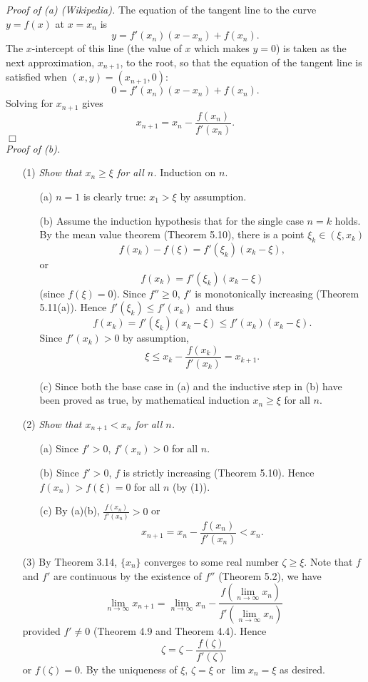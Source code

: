 \documentclass{article}
\begin{document}
\emph{Proof of (a) (Wikipedia).}
The equation of the tangent line to the curve $y = f(x)$ at $x = x_n$ is
\[
  y = f'(x_n)(x - x_n) + f(x_n).
\]
The $x$-intercept of this line (the value of $x$ which makes $y = 0$)
is taken as the next approximation, $x_{n+1}$, to the root,
so that the equation of the tangent line is satisfied when
$(x,y) = (x_{n+1},0)$:
\[
  0 = f'(x_n)(x - x_n) + f(x_n).
\]
Solving for $x_{n+1}$ gives
\[
  x_{n+1} = x_n - \frac{f(x_n)}{f'(x_n)}.
\]
$\Box$ \\



\emph{Proof of (b).}
\begin{enumerate}
\item[(1)]
\emph{Show that $x_n \geq \xi$ for all $n$.}
Induction on $n$.
  \begin{enumerate}
  \item[(a)]
  $n = 1$ is clearly true: $x_1 > \xi$ by assumption.

  \item[(b)]
  Assume the induction hypothesis that for the single case $n = k$ holds.
  By the mean value theorem (Theorem 5.10),
  there is a point $\xi_k \in (\xi, x_k)$
  \[
    f(x_k) - f(\xi) = f'(\xi_k)(x_k - \xi),
  \]
  or
  \[
    f(x_k) = f'(\xi_k)(x_k - \xi)
  \]
  (since $f(\xi) = 0$).
  Since $f'' \geq 0$, $f'$ is monotonically increasing (Theorem 5.11(a)).
  Hence $f'(\xi_k) \leq f'(x_k)$ and thus
  \[
    f(x_k)
    = f'(\xi_k)(x_k - \xi)
    \leq f'(x_k)(x_k - \xi).
  \]
  Since $f'(x_k) > 0$ by assumption,
  \[
    \xi \leq x_k - \frac{f(x_k)}{f'(x_k)} = x_{k+1}.
  \]

  \item[(c)]
  Since both the base case in (a) and
  the inductive step in (b) have been proved as true,
  by mathematical induction $x_n \geq \xi$ for all $n$.
  \end{enumerate}

\item[(2)]
\emph{Show that $x_{n+1} < x_n$ for all $n$.}
  \begin{enumerate}
  \item[(a)]
  Since $f' > 0$, $f'(x_n) > 0$ for all $n$.

  \item[(b)]
  Since $f' > 0$, $f$ is strictly increasing (Theorem 5.10).
  Hence $f(x_n) > f(\xi) = 0$ for all $n$ (by (1)).

  \item[(c)]
  By (a)(b), $\frac{f(x_n)}{f'(x_n)} > 0$ or
  \[
    x_{n+1} = x_n - \frac{f(x_n)}{f'(x_n)} < x_n.
  \]
  \end{enumerate}

\item[(3)]
By Theorem 3.14, $\{x_n\}$ converges to some real number $\zeta \geq \xi$.
Note that $f$ and $f'$ are continuous by the existence of $f''$ (Theorem 5.2),
we have
\[
  \lim_{n \to \infty} x_{n+1}
  = \lim_{n \to \infty} x_n - \frac{f(\lim_{n \to \infty} x_n)}{f'(\lim_{n \to \infty} x_n)}
\]
provided $f' \neq 0$ (Theorem 4.9 and Theorem 4.4).
Hence
\[
  \zeta = \zeta - \frac{f(\zeta)}{f'(\zeta)}
\]
or $f(\zeta) = 0$.
By the uniqueness of $\xi$, $\zeta = \xi$ or $\lim x_n = \xi$ as desired.
\end{enumerate}
\end{document}
